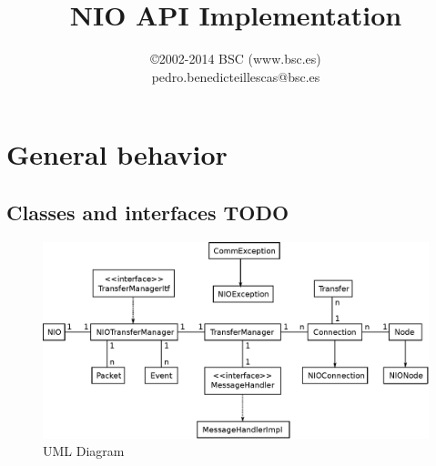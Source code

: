 \documentclass[11pt]{article}
\title{\textbf{NIO API Implementation}}
\author{\copyright 2002-2014 BSC (www.bsc.es)\\pedro.benedicteillescas@bsc.es}
\date{}
\begin{document}
\maketitle

\section{General behavior}
\label{sec:general_behavior}

	\subsection{Classes and interfaces TODO}
		\begin{figure}[H]
		\centering
		\includegraphics[width=160mm]{img/drawing8.eps}
		\caption[UML Diagram]{UML Diagram}
		\label{drawing8}
		\end{figure}
\end{document}
